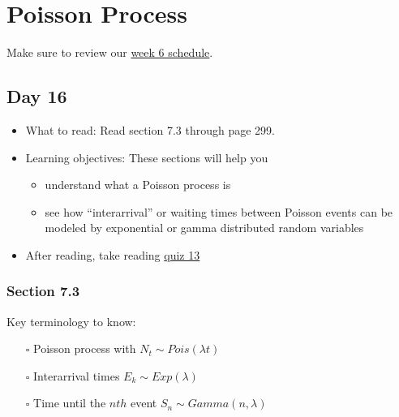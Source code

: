 \documentclass[
  letterpaper,
]{scrbook}
\providecommand{\tightlist}{%
  \setlength{\itemsep}{0pt}\setlength{\parskip}{0pt}}\usepackage{longtable,booktabs,array}
\begin{document}

\chapter{Poisson Process}\label{sec-intro-cont-rv}

Make sure to review our
\href{https://docs.google.com/spreadsheets/d/1qnz5t0OptIaeS-C-bjW4AMzgbrhckJPz4PuElSgGPac/edit?usp=sharing}{week
6 schedule}.

\section*{Day 16}\label{day-16}


\begin{itemize}
\item
  What to read: Read section 7.3 through page 299.
\item
  Learning objectives: These sections will help you

  \begin{itemize}
  \tightlist
  \item
    understand what a Poisson process is
  \item
    see how ``interarrival'' or waiting times between Poisson events can
    be modeled by exponential or gamma distributed random variables
  \end{itemize}
\item
  After reading, take reading
  \href{https://forms.gle/8nwGZxx77bxcvn2f7}{quiz 13}
\end{itemize}

\subsection*{Section 7.3}\label{section-7.3}

Key terminology to know:

\begin{itemize}
\tightlist
\item[$\square$]
  Poisson process with \(N_t \sim Pois(\lambda t)\)
\item[$\square$]
  Interarrival times \(E_k \sim Exp(\lambda)\)
\item[$\square$]
  Time until the \(nth\) event \(S_n \sim Gamma(n,\lambda)\)
\end{itemize}
\end{document}
